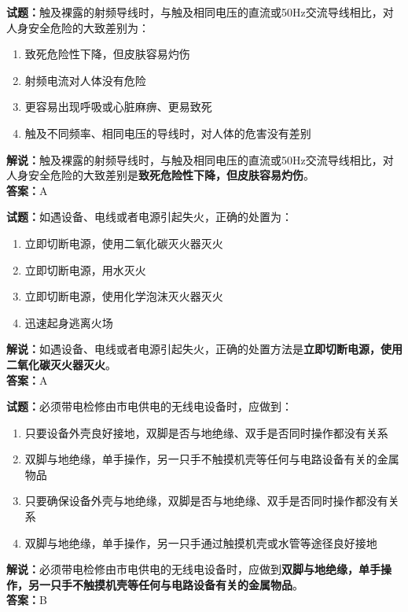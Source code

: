 \documentclass{ctexbook}
\begin{document}
\textbf{试题：}触及裸露的射频导线时，与触及相同电压的直流或50Hz交流导线相比，对人身安全危险的大致差别为：
\begin{enumerate}[leftmargin=3em]
  \item 致死危险性下降，但皮肤容易灼伤
  \item 射频电流对人体没有危险
  \item 更容易出现呼吸或心脏麻痹、更易致死
  \item 触及不同频率、相同电压的导线时，对人体的危害没有差别
\end{enumerate}
\noindent\textbf{解说：}触及裸露的射频导线时，与触及相同电压的直流或50Hz交流导线相比，对人身安全危险的大致差别是\textbf{致死危险性下降，但皮肤容易灼伤}。\\\noindent\textbf{答案：}A

\vspace{1em}

\textbf{试题：}如遇设备、电线或者电源引起失火，正确的处置为：
\begin{enumerate}[leftmargin=3em]
  \item 立即切断电源，使用二氧化碳灭火器灭火
  \item 立即切断电源，用水灭火
  \item 立即切断电源，使用化学泡沫灭火器灭火
  \item 迅速起身逃离火场
\end{enumerate}
\noindent\textbf{解说：}如遇设备、电线或者电源引起失火，正确的处置方法是\textbf{立即切断电源，使用二氧化碳灭火器灭火}。\\\noindent\textbf{答案：}A

\vspace{1em}

\textbf{试题：}必须带电检修由市电供电的无线电设备时，应做到：
\begin{enumerate}[leftmargin=3em]
  \item 只要设备外壳良好接地，双脚是否与地绝缘、双手是否同时操作都没有关系
  \item 双脚与地绝缘，单手操作，另一只手不触摸机壳等任何与电路设备有关的金属物品
  \item 只要确保设备外壳与地绝缘，双脚是否与地绝缘、双手是否同时操作都没有关系
  \item 双脚与地绝缘，单手操作，另一只手通过触摸机壳或水管等途径良好接地
\end{enumerate}
\noindent\textbf{解说：}必须带电检修由市电供电的无线电设备时，应做到\textbf{双脚与地绝缘，单手操作，另一只手不触摸机壳等任何与电路设备有关的金属物品}。\\\noindent\textbf{答案：}B
\end{document}
